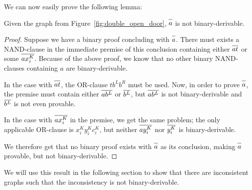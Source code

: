 We can now easily prove the following lemma:
\begin{lemma}
  Given the graph from Figure~\ref{fig:double_open_door}, $\ol{a}$ is not binary-derivable.
  \label{thm:a_not_binary_derivable}
\end{lemma}
\begin{proof}
Suppose we have a binary proof concluding with $\ol{a}$.
There must exists a NAND-clause in the immediate premise of this conclusion containing either $\ol{at}$ or some $\ol{ax^K_i}$.
Because of the above proof, we know that no other binary NAND-clauses containing $a$ are binary-derivable.

In the case with $\ol{at}$, the OR-clause $tb^Lb^R$ must be used.
Now, in order to prove $\ol{a}$, the premise must contain either $\ol{a b^L}$ or $\ol{b^L}$, but $\ol{a b^L}$ is not binary-derivable and $\ol{b^L}$ is not even provable.

In the case with $\ol{ax^K_i}$ in the premise, we get the same problem;
the only applicable OR-clause is $x^K_iy^K_ic^K_i$, but neither $\ol{a y^K_i}$ nor $\ol{y^K_i}$ is binary-derivable.

We therefore get that no binary proof exists with $\ol{a}$ as its conclusion, making $\ol{a}$ provable, but not binary-derivable.
\end{proof}
We will use this result in the following section to show that there are inconsistent graphs such that the inconsistency is not binary-derivable.

